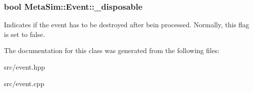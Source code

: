 \subsubsection[{\texorpdfstring{\+\_\+disposable}{_disposable}}]{\setlength{\rightskip}{0pt plus 5cm}bool Meta\+Sim\+::\+Event\+::\+\_\+disposable\hspace{0.3cm}{\ttfamily [protected]}}\hypertarget{classMetaSim_1_1Event_aba0334f8032e55737e7a7121e183ae88}{}\label{classMetaSim_1_1Event_aba0334f8032e55737e7a7121e183ae88}
Indicates if the event has to be destroyed after bein processed. Normally, this flag is set to false. 

The documentation for this class was generated from the following files\+:\begin{DoxyCompactItemize}
\item 
src/event.\+hpp\item 
src/event.\+cpp\end{DoxyCompactItemize}
